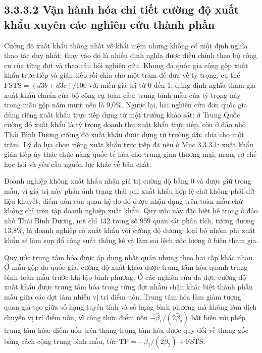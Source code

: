 \documentclass[
  a4paper,
  13pt]{extreport}
\begin{document}
\hypertarget{vux1eadn-huxe0nh-huxf3a-chi-tiux1ebft-cux1b0ux1eddng-ux111ux1ed9-xuux1ea5t-khux1ea9u-xuyuxean-cuxe1c-nghiuxean-cux1ee9u-thuxe0nh-phux1ea7n}{%
\subsection{3.3.3.2 Vận hành hóa chi tiết cường độ xuất khẩu xuyên các
nghiên cứu thành
phần}\label{vux1eadn-huxe0nh-huxf3a-chi-tiux1ebft-cux1b0ux1eddng-ux111ux1ed9-xuux1ea5t-khux1ea9u-xuyuxean-cuxe1c-nghiuxean-cux1ee9u-thuxe0nh-phux1ea7n}}

Cường độ xuất khẩu thống nhất về khái niệm nhưng không có một định nghĩa
thao tác duy nhất; thay vào đó là nhiều định nghĩa được điều chỉnh theo
bộ công cụ của từng đợt và theo câu hỏi nghiên cứu. Khung đa quốc gia
cộng gộp xuất khẩu trực tiếp và gián tiếp rồi chia cho một trăm để đưa
về tỷ trọng, cụ thể \(\mathrm{FSTS} = (d3b + d3c)/100\) với miền giá trị
từ 0 đến 1, đúng định nghĩa tham gia xuất khẩu chuẩn của bộ công cụ toàn
cầu; trung bình mẫu của tỷ trọng này trong mẫu gộp năm mươi nền là
9,0\%. Ngược lại, hai nghiên cứu đơn quốc gia dùng riêng xuất khẩu trực
tiếp dựng từ một trường khảo sát: ở Trung Quốc cường độ xuất khẩu là tỷ
trọng doanh thu xuất khẩu trực tiếp, còn ở đảo nhỏ Thái Bình Dương cường
độ xuất khẩu được dựng từ trường \texttt{d3c} chia cho một trăm. Lý do
lựa chọn riêng xuất khẩu trực tiếp đã nêu ở Mục 3.3.3.1: xuất khẩu gián
tiếp ủy thác chức năng quốc tế hóa cho trung gian thương mại, mang cơ
chế học hỏi và yêu cầu nguồn lực khác về bản chất.

Doanh nghiệp không xuất khẩu nhận giá trị cường độ bằng 0 và được giữ
trong mẫu, vì giá trị này phản ánh trạng thái phi xuất khẩu hợp lệ chứ
không phải dữ liệu khuyết; điểm uốn của quan hệ do đó được nhận dạng
trên toàn mẫu chứ không chỉ trên tập doanh nghiệp xuất khẩu. Quy ước này
đặc biệt hệ trọng ở đảo nhỏ Thái Bình Dương, nơi chỉ 132 trong số 959
quan sát phân tích, tương đương 13,8\%, là doanh nghiệp có xuất khẩu với
cường độ dương: loại bỏ nhóm phi xuất khẩu sẽ làm sụp đổ công suất thống
kê và làm sai lệch ước lượng ở biên tham gia.

Quy ước trung tâm hóa được áp dụng nhất quán nhưng theo hai cấp khác
nhau. Ở mẫu gộp đa quốc gia, cường độ xuất khẩu được trung tâm hóa quanh
trung bình toàn mẫu trước khi lập bình phương. Ở các nghiên cứu đa đợt,
cường độ xuất khẩu được trung tâm hóa trong từng đợt nhằm chặn khác biệt
thành phần mẫu giữa các đợt làm nhiễu vị trí điểm uốn. Trung tâm hóa làm
giảm tương quan giả tạo giữa số hạng tuyến tính và số hạng bình phương
mà không làm dịch chuyển vị trí điểm uốn, vì công thức điểm uốn
\(-\hat\beta_1/(2\hat\beta_2)\) bất biến với phép trung tâm hóa; điểm
uốn trên thang trung tâm hóa được quy đổi về thang gốc bằng cách cộng
trung bình mẫu, tức
\(\mathrm{TP} = -\hat\beta_1/(2\hat\beta_2) + \overline{\mathrm{FSTS}}\).
\end{document}
